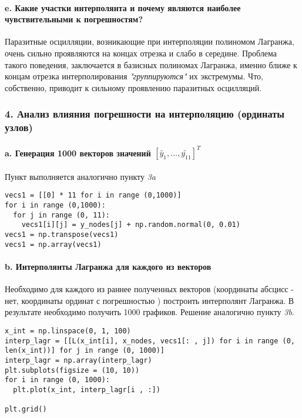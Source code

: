 \paragraph{e. Какие участки интерполянта и почему являются наиболее чувствительными к погрешностям?}
\begin{flushleft}
Паразитные осцилляции, возникающие при интерполяции полиномом Лагранжа, очень сильно проявляются на концах отрезка и слабо в середине.
Проблема такого поведения, заключается в базисных полиномах Лагранжа, именно ближе к концам отрезка интерполирования \textit{"группируются"} их экстремумы. 
Что, собственно, приводит к сильному проявлению паразитных осцилляций.
\end{flushleft}
\subsubsection{4. Анализ влияния погрешности на интерполяцию (ординаты узлов)}
\paragraph{a. Генерация 1000 векторов значений $[\tilde{y_1}, ..., \tilde{y_{11}}]^T$ \\} 
\begin{flushleft}
Пункт выполняется аналогично пункту \textit{3a}
\end{flushleft}
\begin{lstlisting}
vecs1 = [[0] * 11 for i in range (0,1000)]
for i in range (0,1000):
  for j in range (0, 11):
    vecs1[i][j] = y_nodes[j] + np.random.normal(0, 0.01)
vecs1 = np.transpose(vecs1)
vecs1 = np.array(vecs1)
\end{lstlisting}
\paragraph{b. Интерполянты Лагранжа для каждого из векторов \\ }
\begin{flushleft}
Необходимо для каждого из раннее полученных векторов (координаты абсцисс - нет, координаты ординат с погрешностью ) построить интерполянт Лагранжа. В результате необходимо получить 1000 графиков. Решение аналогично
пункту \textit{3b}.
\end{flushleft}
\begin{lstlisting}
x_int = np.linspace(0, 1, 100)
interp_lagr = [[L(x_int[i], x_nodes, vecs1[: , j]) for i in range (0, len(x_int))] for j in range (0, 1000)] 
interp_lagr = np.array(interp_lagr)
plt.subplots(figsize = (10, 10))
for i in range (0, 1000):  
  plt.plot(x_int, interp_lagr[i , :])

plt.grid()
\end{lstlisting}

